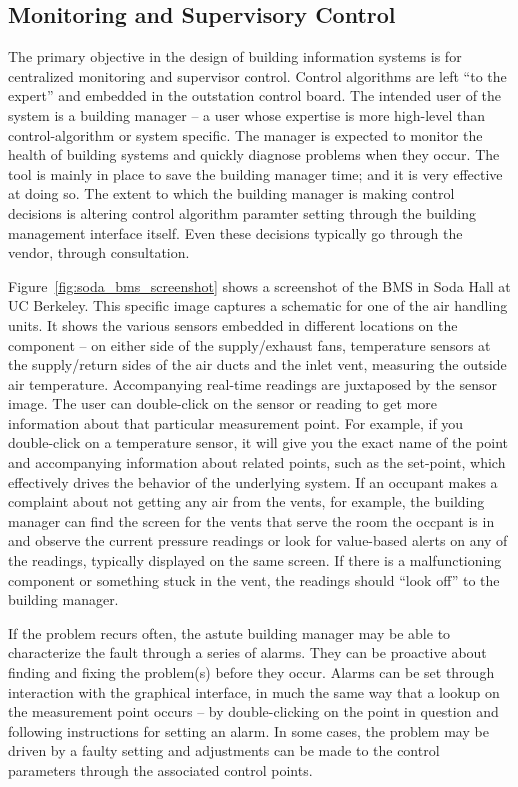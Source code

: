 \subsection{Monitoring and Supervisory Control}
The primary objective in the design of building information systems is for centralized monitoring and supervisor
control.  Control algorithms are left ``to the expert'' and embedded in the outstation control board.  The intended
user of the system is a building manager -- a user whose expertise is more high-level than control-algorithm or system specific.
The manager is expected to monitor the health of building systems and quickly diagnose problems when they occur.  The tool
is mainly in place to save the building manager time; and it is very effective at doing so.  The extent to which 
the building manager is making control decisions is altering control algorithm paramter setting through
the building management interface itself.  Even these decisions typically go through the vendor, through consultation.

Figure~\ref{fig:soda_bms_screenshot} shows a screenshot of the BMS in Soda Hall at UC Berkeley.  This specific image
captures a schematic for one of the air handling units.  It shows the various sensors embedded in different locations
on the component -- on either side of the supply/exhaust fans, temperature sensors at the supply/return sides of the
air ducts and the inlet vent, measuring the outside air temperature.  Accompanying real-time readings are juxtaposed
by the sensor image.  The user can double-click on the sensor or reading to get more information about that particular 
measurement point.  For example, if you double-click on a temperature sensor, it will give you the exact name of the 
point and accompanying information about related points, such as the set-point, which effectively drives the behavior of 
the underlying system.  If an occupant makes a complaint about not getting any air from the vents, for example, the 
building manager can find the screen for the vents that serve the room the occpant is in and observe the current
pressure readings or look for value-based alerts on any of the readings, typically displayed on the same screen.
If there is a malfunctioning component or something stuck in the vent, the readings should ``look off'' to the building 
manager.

If the problem recurs often, the astute building manager may be able to characterize the fault through a series of alarms.
They can be proactive about finding and fixing the problem(s) before they occur.  Alarms can be set through interaction
with the graphical interface, in much the same way that a lookup on the measurement point occurs -- by double-clicking on 
the point in question and following instructions for setting an alarm.  In some cases, the problem may be driven 
by a faulty setting and adjustments can be made to the control parameters through the associated control points.

